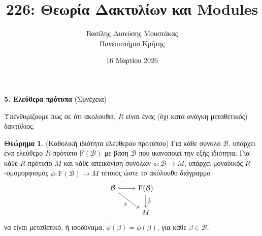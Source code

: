 \documentclass[12pt,a4paper,reqno]{amsart}
\title{226: Θεωρία Δακτυλίων και Modules}
\author[Β.~Δ. Μουστακας]{Βασίλης Διονύσης Μουστάκας \\ Πανεπιστήμιο Κρήτης}
\date{16 Μαρτίου 2026}
\theoremstyle{definition}
\newtheorem{theorem}{Θεώρημα}
\theoremstyle{remark}
\numberwithin{theorem}{section}
\numberwithin{exercise}{section}
\numberwithin{equation}{section}
\newcommand{\bB}{\mathcal{B}}
\newcommand{\rmF}{\mathrm{F}}
\renewcommand{\to}{\rightarrow}
\begin{document}
\begingroup
\def\uppercasenonmath#1{} %
\let\MakeUppercase\relax %
\maketitle
\endgroup

\setcounter{section}{5}
\setcounter{theorem}{2}
\begin{center}
    \textbf{5. Ελεύθερα πρότυπα
} (Συνέχεια)
\end{center}

Υπενθυμίζουμε πως σε ότι ακολουθεί, $R$ είναι ένας (όχι κατά ανάγκη μεταθετικός) δακτύλιος.

\begin{theorem}{\rm(Καθολική ιδιότητα ελεύθερου προτύπου)}
    \label{thm:universal_property_freeMods}
    Για κάθε σύνολο $\bB$, υπάρχει ένα ελεύθερο $R$-πρότυπο $\rmF(\bB)$ με βάση $\bB$ που ικανοποιεί την εξής ιδιότητα: Για κάθε $R$-πρότυπο $M$ και κάθε απεικόνιση συνόλων $\phi : \bB \to M$, υπάρχει μοναδικός $R$-ομομορφισμός $\tilde{\phi} : \rmF(\bB) \to M$ τέτοιος ώστε το ακόλουθο διάγραμμα  
    \[
    \begin{tikzcd}
    \bB \arrow[r, hook] \arrow[dr, "\phi"'] & \rmF(\bB) \arrow[d, "\tilde{\phi}"] \\
                                           & M
    \end{tikzcd}
    \]
    να είναι μεταθετικό, ή ισοδύναμα, $\tilde{\phi}(\beta) = \phi(\beta)$, για κάθε $\beta \in \bB$.
\end{theorem}
\end{document}
